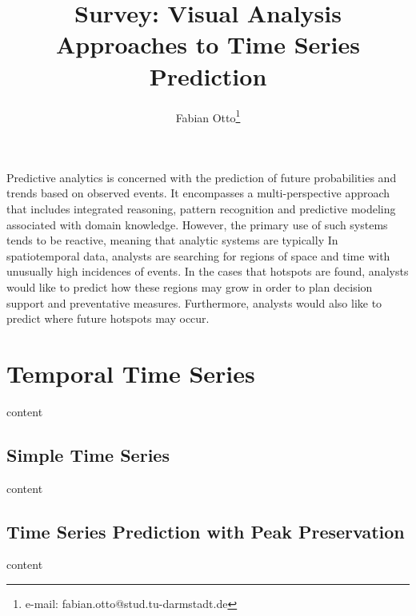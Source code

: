 \documentclass[electronic]{vgtc}             %
\title{Survey: Visual Analysis Approaches to Time Series Prediction}
\author{Fabian Otto\thanks{e-mail: fabian.otto@stud.tu-darmstadt.de}}
\affiliation{\scriptsize Technical University Darmstadt}
\begin{document}

\maketitle

Predictive analytics is concerned with the prediction of future probabilities and trends based on observed events. 
It encompasses a multi-perspective approach that includes integrated reasoning, pattern recognition and predictive modeling associated with domain knowledge.
However, the primary use of such systems tends to be reactive, meaning that analytic systems are typically
In spatiotemporal data, analysts are searching for regions of space and time with unusually high incidences of events.
In the cases that hotspots are found, analysts would like to predict how these regions may grow in order to plan decision support and preventative measures.
Furthermore, analysts would also like to predict where future hotspots may occur.

\section{Temporal Time Series \label{sec:temporal}}
content 

\subsection{Simple Time Series \label{subsec:simple}}
content

\subsection{Time Series Prediction with Peak Preservation \label{subsec:peak}}
content
\end{document}
